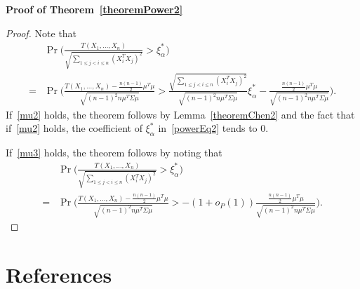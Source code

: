 \documentclass[review]{elsarticle}
\theoremstyle{plain}
\theoremstyle{definition}
\theoremstyle{remark}
\begin{document}
\textbf{Proof of Theorem~\ref{theoremPower2}}
\begin{proof}
    Note that
    \begin{align}
            &\Pr\bigg(\frac{T( X_1,\ldots, X_n)}{\sqrt{\sum_{1\leq j<i\leq n}{(X_i^T X_j)}^2}}>\xi_{\alpha}^* \bigg)\nonumber\\
            =&
            \Pr\bigg(\frac{T( X_1,\ldots, X_n)-\frac{n(n-1)}{2}\mu^T\mu}{\sqrt{{(n-1)}^2 n \mu^T\Sigma\mu}}>
            \frac{\sqrt{\sum_{1\leq j<i\leq n}{{(X_i^T X_j)}^2}}}{\sqrt{{(n-1)}^2 n \mu^T\Sigma\mu}}\xi_{\alpha}^*-\frac{\frac{n(n-1)}{2}\mu^T\mu}{\sqrt{{(n-1)}^2 n \mu^T\Sigma\mu}} \bigg).
            \label{powerEq2}
    \end{align}
    If~\eqref{mu2} holds, the theorem follows by Lemma~\ref{theoremChen2} and the fact that if~\eqref{mu2} holds, the coefficient of $\xi_\alpha^*$ in~\eqref{powerEq2} tends to $0$.

    If~\eqref{mu3} holds, the theorem follows by noting that
    \begin{equation*}
        \begin{aligned}
            &\Pr\bigg(\frac{T( X_1,\ldots, X_n)}{\sqrt{\sum_{1\leq j<i\leq n}{(X_i^T X_j)}^2}}>\xi_{\alpha}^* \bigg)\\
            =&
            \Pr\bigg(\frac{T( X_1,\ldots, X_n)-\frac{n(n-1)}{2}\mu^T\mu}{\sqrt{{(n-1)}^2 n \mu^T\Sigma\mu}}>
            -(1+o_P(1))\frac{\frac{n(n-1)}{2}\mu^T\mu}{\sqrt{{(n-1)}^2 n \mu^T\Sigma\mu}} \bigg).
        \end{aligned}
    \end{equation*}
\end{proof}






\section*{References}

\end{document}

